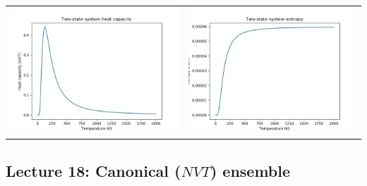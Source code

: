 \documentclass[11pt]{article}
\begin{document}
\begin{table}
\begin{tabular}{cc}
\includegraphics[scale=0.5]{Images/2state-heatcapacity.png} & \includegraphics[scale=0.5]{Images/2state-entropy.png}
\end{tabular}
\end{table}
\subsection{Lecture 18: Canonical (\(NVT\)) ensemble}
\label{sec:org4005147}
\end{document}

